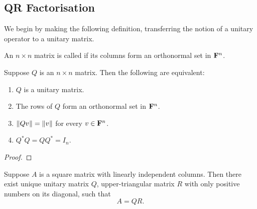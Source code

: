 \subsection{QR Factorisation}
We begin by making the following definition, transferring the notion of a unitary operator to a unitary matrix.

\begin{definition}
An $n\times n$ matrix is called  if its columns form an orthonormal set in $\mathbf F^n$.
\end{definition}

\begin{lemma}
Suppose $Q$ is an $n\times n$ matrix. Then the following are equivalent:
\begin{enumerate}[label=(\roman*)]
\item $Q$ is a unitary matrix.
\item The rows of $Q$ form an orthonormal set in $\mathbf F^n$.
\item $\norm{Qv}=\norm{v}$ for every $v\in\mathbf F^n$.
\item $Q^*Q=QQ^*=I_n$.
\end{enumerate}
\end{lemma}

\begin{proof}

\end{proof}

\begin{theorem}[QR factorisation]
Suppose $A$ is a square matrix with linearly independent columns. Then there exist unique unitary matrix $Q$, upper-triangular matrix $R$ with only positive numbers on its diagonal, such that
\begin{equation}
A=QR.
\end{equation}
\end{theorem}

